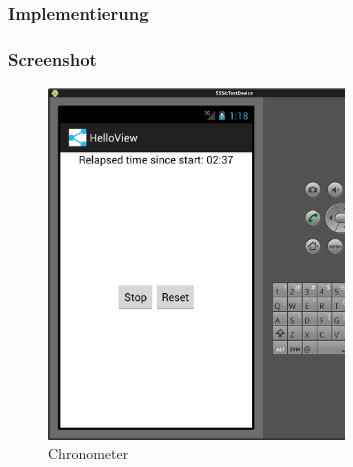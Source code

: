 \begin{frame}
   \frametitle{Implementierung}
   
\end{frame}

\begin{frame}
   \frametitle{Screenshot}
   \begin{figure}[h!]
     \centering
     \includegraphics[width=0.7\textwidth]{pictures/chronometer.ps}
     \caption{
        Chronometer
     }
     \label{fig:chronometer}
   \end{figure}
\end{frame}


